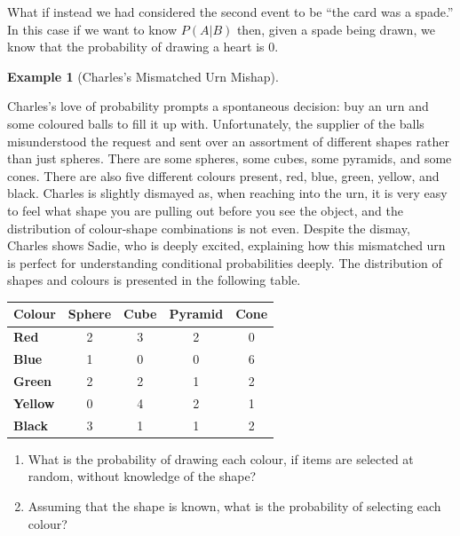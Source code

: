 \documentclass[
  letterpaper,
  DIV=11,
  numbers=noendperiod]{scrreprt}
\providecommand{\tightlist}{%
  \setlength{\itemsep}{0pt}\setlength{\parskip}{0pt}}\usepackage{longtable,booktabs,array}
\theoremstyle{definition}
\theoremstyle{definition}
\theoremstyle{definition}
\newtheorem{example}{Example}[chapter]
\theoremstyle{remark}
\begin{document}
What if instead we had considered the second event to be ``the card was
a spade.'' In this case if we want to know \(P(A|B)\) then, given a
spade being drawn, we know that the probability of drawing a heart is
\(0\).

\begin{example}[Charles's Mismatched Urn
Mishap]\protect\hypertarget{exm-conditional-probability-urn}{}\label{exm-conditional-probability-urn}

Charles's love of probability prompts a spontaneous decision: buy an urn
and some coloured balls to fill it up with. Unfortunately, the supplier
of the balls misunderstood the request and sent over an assortment of
different shapes rather than just spheres. There are some spheres, some
cubes, some pyramids, and some cones. There are also five different
colours present, red, blue, green, yellow, and black. Charles is
slightly dismayed as, when reaching into the urn, it is very easy to
feel what shape you are pulling out before you see the object, and the
distribution of colour-shape combinations is not even. Despite the
dismay, Charles shows Sadie, who is deeply excited, explaining how this
mismatched urn is perfect for understanding conditional probabilities
deeply. The distribution of shapes and colours is presented in the
following table.

\begin{longtable}[]{@{}lcccc@{}}
\toprule\noalign{}
\textbf{Colour} & \textbf{Sphere} & \textbf{Cube} & \textbf{Pyramid} &
\textbf{Cone} \\
\midrule\noalign{}
\endhead
\bottomrule\noalign{}
\endlastfoot
\textbf{Red} & 2 & 3 & 2 & 0 \\
\textbf{Blue} & 1 & 0 & 0 & 6 \\
\textbf{Green} & 2 & 2 & 1 & 2 \\
\textbf{Yellow} & 0 & 4 & 2 & 1 \\
\textbf{Black} & 3 & 1 & 1 & 2 \\
\end{longtable}

\begin{enumerate}
\def\labelenumi{\alph{enumi}.}
\tightlist
\item
  What is the probability of drawing each colour, if items are selected
  at random, without knowledge of the shape?
\item
  Assuming that the shape is known, what is the probability of selecting
  each colour?
\end{enumerate}


\end{example}
\end{document}
